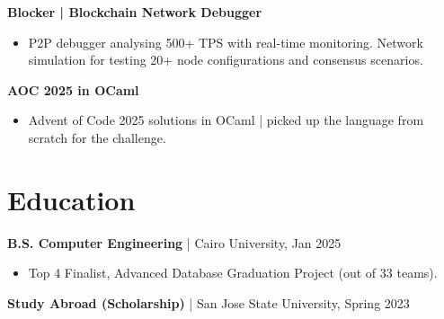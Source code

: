 \documentclass[a4paper,10pt]{article}
\newcommand{\project}[1]{%
    {\fontsize{7.5}{9.5}\selectfont\textbf{#1}}\\[0.2mm]%
}
\begin{document}
\project{Blocker | Blockchain Network Debugger}
\begin{itemize}
    \item P2P debugger analysing 500+ TPS with real-time monitoring. Network simulation for testing 20+ node configurations and consensus scenarios.
\end{itemize}

\project{AOC 2025 in OCaml}
\begin{itemize}
    \item Advent of Code 2025 solutions in OCaml | picked up the language from scratch for the challenge.
\end{itemize}

\section{Education}
\textbf{B.S. Computer Engineering} | Cairo University, Jan 2025\\
\begin{itemize}
    \item Top 4 Finalist, Advanced Database Graduation Project (out of 33 teams).
\end{itemize}
\textbf{Study Abroad (Scholarship)} | San Jose State University, Spring 2023
\end{document}
